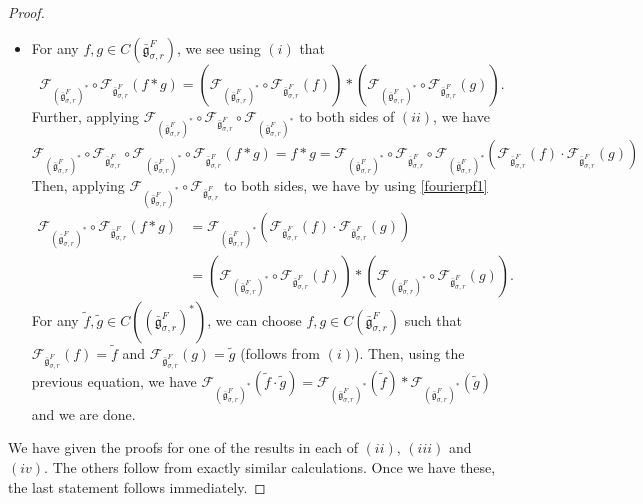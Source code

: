 \documentclass[11 pt]{article}
\numberwithin{equation}{subsection}
\theoremstyle{definition}
\theoremstyle{remark}
\theoremstyle{conjecture}
\newcommand{\bg}{\bar{\mathfrak g}}
\newcommand{\mcF}{\mathcal F}
\begin{document}
\begin{proof}
\begin{itemize}
\begin{align*}
            &=\left(\left|\bg_{\sigma,r}^F\right|^{-1/2}\sum_{Y\in \bg_{\sigma,r}^F}\Tilde\psi( X^*(Y-Z))f(Y-Z)\right)\left(\left|\bg_{\sigma,r}^F\right|^{-1/2}\sum_{Z\in \bg_{\sigma,r}^F}\Tilde\psi( X^*(Z))g(Z)\right)\\
            &=  \mcF_{\bg_{\sigma,r}^F}(f)(X^*)\cdot  \mcF_{\bg_{\sigma,r}^F}(g)(X^*)\\
        \end{align*} 
        \item[(iv)] For any $f,g \in  C\left(\bg_{\sigma,r}^F\right)$, we see using $(i)$ that 
        \begin{equation}\label{fourierpf1}
            \mcF_{(\bg_{\sigma,r}^F)^*}\circ\mcF_{\bg_{\sigma,r}^F}(f*g)= \left(\mcF_{(\bg_{\sigma,r}^F)^*}\circ\mcF_{\bg_{\sigma,r}^F}(f)\right)*\left(\mcF_{(\bg_{\sigma,r}^F)^*}\circ\mcF_{\bg_{\sigma,r}^F}(g)\right).
        \end{equation}
        Further, applying $\mcF_{(\bg_{\sigma,r}^F)^*}\circ \mcF_{\bg_{\sigma,r}^F}\circ \mcF_{(\bg_{\sigma,r}^F)^*}$ to both sides of $(ii)$, we have 
       \[
       \mcF_{(\bg_{\sigma,r}^F)^*}\circ \mcF_{\bg_{\sigma,r}^F}\circ \mcF_{(\bg_{\sigma,r}^F)^*} \circ \mcF_{\bg_{\sigma,r}^F}(f*g)= f*g=\mcF_{(\bg_{\sigma,r}^F)^*}\circ \mcF_{\bg_{\sigma,r}^F}\circ \mcF_{(\bg_{\sigma,r}^F)^*}\left(\mcF_{\bg_{\sigma,r}^F}(f)\cdot \mcF_{\bg_{\sigma,r}^F}(g)\right)
        \]
         Then, applying $\mcF_{(\bg_{\sigma,r}^F)^*} \circ \mcF_{\bg_{\sigma,r}^F}$ to both sides, we have by using \eqref{fourierpf1}
        \begin{align*}
            \mcF_{(\bg_{\sigma,r}^F)^*} \circ \mcF_{\bg_{\sigma,r}^F}(f*g)&=\mcF_{(\bg_{\sigma,r}^F)^*}\left(\mcF_{\bg_{\sigma,r}^F}(f)\cdot \mcF_{\bg_{\sigma,r}^F}(g)\right)\\
            &= \left(\mcF_{(\bg_{\sigma,r}^F)^*}\circ\mcF_{\bg_{\sigma,r}^F}(f)\right)*\left(\mcF_{(\bg_{\sigma,r}^F)^*}\circ\mcF_{\bg_{\sigma,r}^F}(g)\right).
        \end{align*}
         For any $\tilde f, \tilde g \in C\left((\bg_{\sigma,r}^F)^*\right)$, we can choose $f, g \in  C\left(\bg_{\sigma,r}^F\right)$ such that $\mcF_{\bg_{\sigma,r}^F}(f)=\tilde f$ and $\mcF_{\bg_{\sigma,r}^F}(g)=\tilde g$ (follows from $(i)$). Then, using the previous equation, we have $\mcF_{(\bg_{\sigma,r}^F)^*}(\tilde f \cdot \tilde g) = \mcF_{(\bg_{\sigma,r}^F)^*}(\tilde f) * \mcF_{(\bg_{\sigma,r}^F)^*}(\tilde g)$ and we are done. 
    \end{itemize}
    We have given the proofs for one of the results in each of $(ii)$, $(iii)$ and $(iv)$. The others follow from exactly similar calculations. Once we have these, the last statement follows immediately.  
\end{proof}
\end{document}
